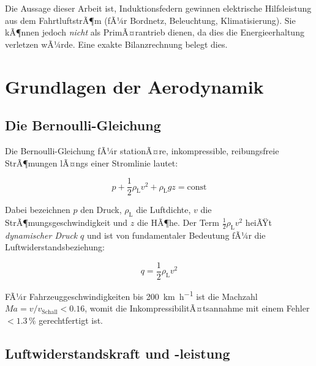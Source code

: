 ﻿\documentclass[12pt, a4paper]{report}
\theoremstyle{definition}
\theoremstyle{remark}
\newcommand{\rhoL}{\rho_{\text{L}}}
\begin{document}
Die Aussage dieser Arbeit ist, Induktionsfedern gewinnen elektrische Hilfsleistung aus dem FahrtluftstrÃ¶m (fÃ¼r Bordnetz, Beleuchtung, Klimatisierung). Sie kÃ¶nnen jedoch \emph{nicht} als PrimÃ¤rantrieb dienen, da dies die Energieerhaltung verletzen wÃ¼rde. Eine exakte Bilanzrechnung belegt dies.

\chapter{Grundlagen der Aerodynamik}
\label{chap:aerodynamik}

\section{Die Bernoulli-Gleichung}

Die Bernoulli-Gleichung fÃ¼r stationÃ¤re, inkompressible, reibungsfreie StrÃ¶mungen
lÃ¤ngs einer Stromlinie lautet:

\begin{equation}
  p + \frac{1}{2}\rhoL v^2 + \rhoL g z = \text{const}
  \label{eq:bernoulli}
\end{equation}

Dabei bezeichnen $p$ den Druck, $\rhoL$ die Luftdichte, $v$ die StrÃ¶mungsgeschwindigkeit
und $z$ die HÃ¶he. Der Term $\frac{1}{2}\rhoL v^2$ heiÃŸt \emph{dynamischer Druck}
$q$ und ist von fundamentaler Bedeutung fÃ¼r die Luftwiderstandsbeziehung:

\begin{equation}
  q = \frac{1}{2}\rhoL v^2
  \label{eq:dyn_druck}
\end{equation}

FÃ¼r Fahrzeuggeschwindigkeiten bis \SI{200}{\kilo\metre\per\hour} ist die
Machzahl $Ma = v/v_{\text{Schall}} < 0.16$, womit die InkompressibilitÃ¤ts\-annahme
mit einem Fehler $< 1.3\,\%$ gerechtfertigt ist.

\section{Luftwiderstandskraft und -leistung}
\end{document}
